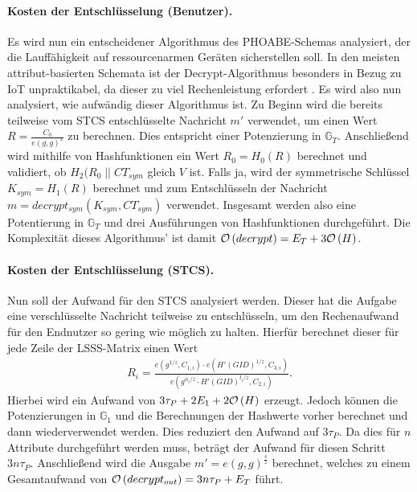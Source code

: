 \paragraph{Kosten der Entschlüsselung (Benutzer).}
Es wird nun ein entscheidener Algorithmus des PHOABE-Schemas analysiert, der die
Lauffähigkeit auf ressourcenarmen Geräten sicherstellen soll. In den meisten
attribut-basierten Schemata ist der Decrypt-Algorithmus besonders in Bezug zu
IoT unpraktikabel, da dieser zu viel Rechenleistung erfordert \cite{phoabe}. Es
wird also nun analysiert, wie aufwändig dieser Algorithmus ist. Zu Beginn wird
die bereits teilweise vom STCS entschlüsselte Nachricht $m'$ verwendet, um einen
Wert $R = \frac{C_0}{e(g, g)^s}$ zu berechnen. Dies entspricht einer
Potenzierung in $\mathbb{G}_T$. Anschließend wird mithilfe von Hashfunktionen
ein Wert $R_0 = H_0(R)$ berechnet und validiert, ob $H_2(R_0 \;||\; CT_{sym}$
gleich $V$ ist. Falls ja, wird der symmetrische Schlüssel $K_{sym} = H_1(R)$
berechnet und zum Entschlüsseln der Nachricht $m = decrypt_{sym}(K_{sym},
CT_{sym})$ verwendet. Insgesamt werden also eine Potentierung in
$\mathbb{G}_T$ und drei Ausführungen von Hashfunktionen durchgeführt.
Die Komplexität dieses Algorithmus' ist damit $\mathcal{O} \left( decrypt \right) = E_T + 3\mathcal{O} \left( H \right)$.

\paragraph{Kosten der Entschlüsselung (STCS).}
Nun soll der Aufwand für den STCS analysiert werden. Dieser hat die Aufgabe eine
verschlüsselte Nachricht teilweise zu entschlüsseln, um den Rechenaufwand für
den Endnutzer so gering wie möglich zu halten. Hierfür berechnet dieser für jede
Zeile der LSSS-Matrix einen Wert
\begin{align*}
  R_i = \frac{e(g^{1/z}, C_{1,i}) \cdot e(H'(GID)^{1/z}, C_{3,i})}{e(g^{\alpha_i
  / z} \cdot H'(GID)^{t_i/z}, C_{2, i})}.
\end{align*}
Hierbei wird ein Aufwand von $3\tau_P + 2E_1 + 2\mathcal{O} \left( H \right)$ erzeugt. Jedoch können
die Potenzierungen in $\mathbb{G}_1$ und die Berechnungen der Hashwerte vorher
berechnet und dann wiederverwendet werden. Dies reduziert den Aufwand auf
$3\tau_P$. Da dies für $n$ Attribute durchgeführt werden muss, beträgt der
Aufwand für diesen Schritt $3n\tau_P$. Anschließend wird die Ausgabe $m' =
e(g, g)^{\frac{s}{z}}$ berechnet, welches zu einem Gesamtaufwand von
$\mathcal{O} \left( decrypt_{out} \right) = 3n\tau_P + E_T$ führt.
